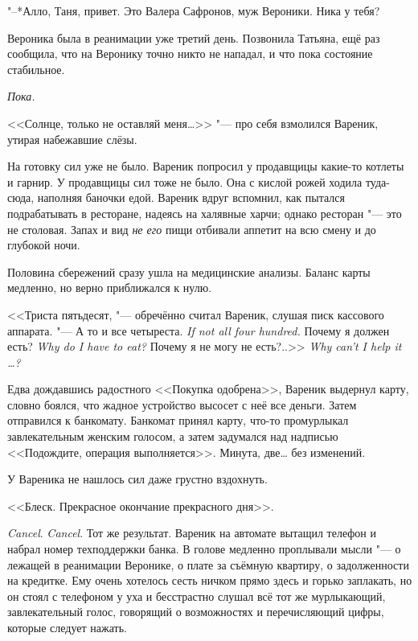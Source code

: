 "--*Алло, Таня, привет.
Это Валера Сафронов, муж Вероники.
Ника у тебя?

\asterism

\textspace

\label{Wed_2012_06_13}

Вероника была в реанимации уже третий день.
Позвонила Татьяна, ещё раз сообщила, что на Веронику точно никто не нападал, и что пока состояние стабильное.

\emph{Пока.}

<<Солнце, только не оставляй меня\ldots{}>> "--- про себя взмолился Вареник, утирая набежавшие слёзы.

На готовку сил уже не было.
Вареник попросил у продавщицы какие-то котлеты и гарнир.
У продавщицы сил тоже не было.
Она с кислой рожей ходила туда-сюда, наполняя баночки едой.
Вареник вдруг вспомнил, как пытался подрабатывать в ресторане, надеясь на халявные харчи;
однако ресторан "--- это не столовая.
Запах и вид \emph{не его} пищи отбивали аппетит на всю смену и до глубокой ночи.

Половина сбережений сразу ушла на медицинские анализы.
Баланс карты медленно, но верно приближался к нулю.

<<Триста пятьдесят, "--- обречённо считал Вареник, слушая писк кассового аппарата.
{"--- А то и все четыреста.}
{\textit{If not all four hundred.}}
{Почему я должен есть?}
{\textit{Why do I have to eat?}}
{Почему я не могу не есть?..>>}
{\textit{Why can't I help it \ldots{}?}}

Едва дождавшись радостного <<Покупка одобрена>>, Вареник выдернул карту, словно боялся, что жадное устройство высосет с неё все деньги.
Затем отправился к банкомату.
Банкомат принял карту, что-то промурлыкал завлекательным женским голосом, а затем задумался над надписью <<Подождите, операция выполняется>>.
Минута, две\ldots{} без изменений.

У Вареника не нашлось сил даже грустно вздохнуть.

<<Блеск.
Прекрасное окончание прекрасного дня>>.

\textit{Cancel}.
\textit{Cancel}.
Тот же результат.
Вареник на автомате вытащил телефон и набрал номер техподдержки банка.
В голове медленно проплывали мысли "--- о лежащей в реанимации Веронике, о плате за съёмную квартиру, о задолженности на кредитке.
Ему очень хотелось сесть ничком прямо здесь и горько заплакать, но он стоял с телефоном у уха и бесстрастно слушал всё тот же мурлыкающий, завлекательный голос, говорящий о возможностях и перечисляющий цифры, которые следует нажать.

